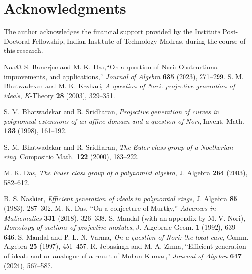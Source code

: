 \documentclass[11pt,reqno]{amsart}
\theoremstyle{plain}
\theoremstyle{definition}
\begin{document}
\section*{Acknowledgments}
The author acknowledges the financial support provided by the Institute Post-Doctoral Fellowship, Indian Institute of Technology Madras, during the course of this research.
\begin{thebibliography}{Nas83}
 S. Banerjee and M. K. Das,``On a question of Nori: Obstructions, improvements, and applications,''
\textit{Journal of Algebra} \textbf{635} (2023), 271--299.
 S. M. Bhatwadekar and M. K. Keshari, \emph{A question of Nori: projective
generation of ideals}, $K$-Theory \textbf{28} (2003), 329--351.

 S. M. Bhatwadekar and R. Sridharan, \emph{Projective generation of curves
in polynomial extensions of an affine domain and a question of Nori}, Invent. Math.
\textbf{133} (1998), 161--192.

 S. M. Bhatwadekar and R. Sridharan, \emph{The Euler class group of a
Noetherian ring}, Compositio Math. \textbf{122} (2000), 183--222.


 M. K. Das, \emph{The Euler class group of a polynomial algebra},
J. Algebra \textbf{264} (2003), 582--612.

 B. S. Nashier, \emph{Efficient generation of ideals in polynomial
rings}, J. Algebra \textbf{85} (1983), 287--302.
 M. K. Das,
``On a conjecture of Murthy,''
\textit{Advances in Mathematics} \textbf{331} (2018), 326--338.
 S. Mandal (with an appendix by M. V. Nori), \emph{Homotopy of sections
of projective modules}, J. Algebraic Geom. \textbf{1} (1992), 639--646.
 S. Mandal and P. L. N. Varma, \emph{On a question of Nori: the local
case}, Comm. Algebra \textbf{25} (1997), 451--457.
R. Jebasingh and M. A. Zinna,
``Efficient generation of ideals and an analogue of a result of Mohan Kumar,''
\textit{Journal of Algebra} \textbf{647} (2024), 567--583.


\end{thebibliography}
\end{document}
